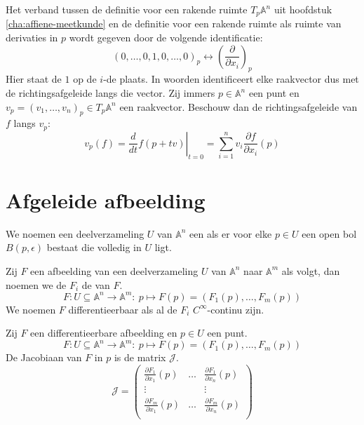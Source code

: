 \documentclass[main.tex]{subfiles}
\begin{document}
\begin{opm}
  Het verband tussen de definitie voor een rakende ruimte $T_{p}\mathbb{A}^{n}$ uit hoofdstuk \ref{cha:affiene-meetkunde} en de definitie voor een rakende ruimte als ruimte van derivaties in $p$ wordt gegeven door de volgende identificatie:
  \[ 
  (0,\dotsc,0,1,0,\dotsc,0)_{p}
  \leftrightarrow
  \left(\frac{\partial}{\partial x_{i}}\right)_{p}
  \]
  Hier staat de $1$ op de $i$-de plaats.
  In woorden identificeert elke raakvector dus met de richtingsafgeleide langs die vector.
  Zij immers $p\in\mathbb{A}^{n}$ een punt en $v_{p} = (v_{1},\dotsc,v_{n})_{p} \in T_{p}\mathbb{A}^{n}$ een raakvector.
  Beschouw dan de richtingsafgeleide van $f$ langs $v_{p}$:
  \[ v_{p}(f) = \left.\frac{d}{dt}f(p+tv)\right|_{t=0} = \sum_{i=1}^{n}v_{i}\frac{\partial f}{\partial x_{i}}(p)\]
\end{opm}

\section{Afgeleide afbeelding}
\label{sec:afgeleide-afbeelding}

\begin{de}
  We noemen een deelverzameling $U$ van $\mathbb{A}^{n}$ een  als er voor elke $p\in U$ een open bol $B(p,\epsilon)$ bestaat die volledig in $U$ ligt.
\end{de}

\begin{de}
  Zij $F$ een afbeelding van een deelverzameling $U$ van $\mathbb{A}^{n}$ naar $\mathbb{A}^{m}$ als volgt, dan noemen we de $F_{i}$ de  van $F$.
  \[ F: U\subseteq \mathbb{A}^{n} \rightarrow \mathbb{A}^{m}:\ p\mapsto F(p) = (F_{1}(p),\dotsc,F_{m}(p)) \]  
  We noemen $F$ differentieerbaar als al de $F_{i}$ $C^{\infty}$-continu zijn. 
\end{de}

\begin{de}
  Zij $F$ een differentieerbare afbeelding en $p \in U$ een punt.
  \[ F: U\subseteq \mathbb{A}^{n} \rightarrow \mathbb{A}^{m}:\ p\mapsto F(p) = (F_{1}(p),\dotsc,F_{m}(p)) \]
  De Jacobiaan van $F$ in $p$ is de matrix $\mathcal{J}$.
  \[
  \mathcal{J} = 
  \begin{pmatrix}
  \frac{\partial F_{1}}{\partial x_{1}}(p) & \hdots & \frac{\partial F_{1}}{\partial x_{n}}(p)\\
  \vdots & & \vdots\\
  \frac{\partial F_{m}}{\partial x_{1}}(p) & \hdots & \frac{\partial F_{m}}{\partial x_{n}}(p)\\
  \end{pmatrix}
  \]  
\end{de}
\end{document}
